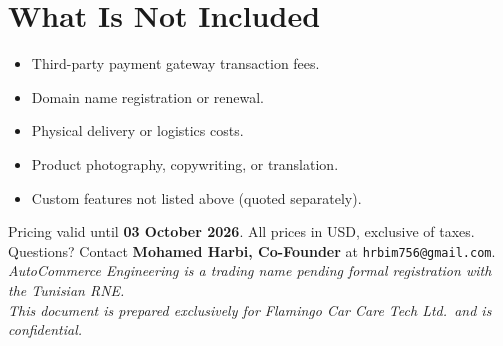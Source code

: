 \documentclass[11pt,a4paper]{article}
\begin{document}
\section*{What Is Not Included}

\begin{itemize}[leftmargin=1.4em,itemsep=3pt]
  \item Third-party payment gateway transaction fees.
  \item Domain name registration or renewal.
  \item Physical delivery or logistics costs.
  \item Product photography, copywriting, or translation.
  \item Custom features not listed above (quoted separately).
\end{itemize}

\vfill
\begin{center}
  \small\color{gray}
  Pricing valid until \textbf{03 October 2026}. All prices in
  USD, exclusive of taxes.\\
  Questions? Contact \textbf{Mohamed Harbi, Co-Founder} at
  \texttt{hrbim756@gmail.com}.\\[0.2em]
  \textit{AutoCommerce Engineering is a trading name pending formal
  registration with the Tunisian RNE.}\\[0.2em]
  \textit{This document is prepared exclusively for Flamingo
  Car Care Tech Ltd.\ and is confidential.}
\end{center}
\end{document}
